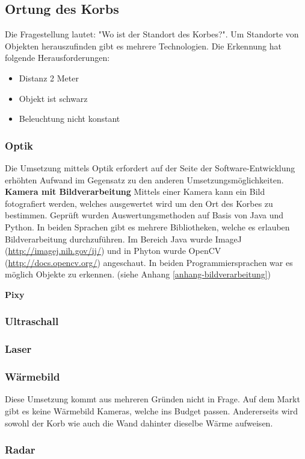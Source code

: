 \subsection{Ortung des Korbs}
Die Fragestellung lautet: "Wo ist der Standort des Korbes?". Um Standorte von Objekten herauszufinden gibt es mehrere Technologien. Die Erkennung hat folgende Herausforderungen:
\begin{itemize}
	\item Distanz 2 Meter
	\item Objekt ist schwarz
	\item Beleuchtung nicht konstant
\end{itemize}

\subsubsection{Optik}
Die Umsetzung mittels Optik erfordert auf der Seite der Software-Entwicklung erhöhten Aufwand im Gegensatz zu den anderen Umsetzungsmöglichkeiten.
\newline\newline
\textbf{Kamera mit Bildverarbeitung}\newline
Mittels einer Kamera kann ein Bild fotografiert werden, welches ausgewertet wird um den Ort des Korbes zu bestimmen. Geprüft wurden Auswertungsmethoden auf Basis von Java und Python. In beiden Sprachen gibt es mehrere Bibliotheken, welche es erlauben Bildverarbeitung durchzuführen. Im Bereich Java wurde ImageJ (\href{http://imagej.nih.gov/ij/}{http://imagej.nih.gov/ij/}) und in Phyton wurde OpenCV (\href{http://docs.opencv.org/}{http://docs.opencv.org/}) angeschaut. In beiden Programmiersprachen war es möglich Objekte zu erkennen. (siehe Anhang \ref{anhang-bildverarbeitung})\newline

\textbf{Pixy}\newline



\subsubsection{Ultraschall}

\subsubsection{Laser}

\subsubsection{Wärmebild}
Diese Umsetzung kommt aus mehreren Gründen nicht in Frage. Auf dem Markt gibt es keine Wärmebild Kameras, welche ins Budget passen. Andererseits wird sowohl der Korb wie auch die Wand dahinter dieselbe Wärme aufweisen.

\subsubsection{Radar}